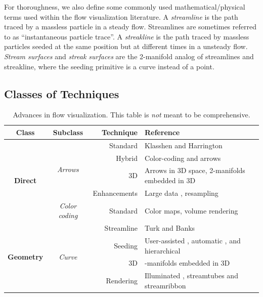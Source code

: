 For thoroughness, we also define some commonly used mathematical/physical terms used within the flow visualization literature.
A \emph{streamline} is the path traced by a massless particle in a steady flow. Streamlines are sometimes referred to as ``instantaneous particle trace''.
%
A \emph{streakline} is the path traced by massless particles seeded at the same position but at different times in a unsteady flow. 
%
\emph{Stream surfaces} and \emph{streak surfaces} are the 2-manifold analog of streamlines and streakline, where the seeding primitive is a curve instead of a point.

\subsection{Classes of Techniques}

\begin{table}
\caption{\label{table:progress}Advances in flow visualization. This table is \emph{not} meant to be comprehensive.}{}\centering
\begin{tabular}{c c r p{7.25cm}}
\toprule
Class &  Subclass & Technique & Reference\\
\hline
\multirow{5}{*}{\bf Direct} 	&\multirow{4}{*}{\em Arrows}		& \cc Standard  & \cc Klasshen and Harrington \cite{Klassen:1991:SHT:949607.949631} \\
					&							& \cc Hybrid  	& \cc Color-coding and arrows \cite{Kirby:1999:VMD:319351.319429}\\
					&							& \cc 3D  			& \cc Arrows in 3D space, 2-manifolds embedded in 3D \cite{Peng:2012:MVF:2086335.2086624}\\
					&							& \cc Enhancements& \cc Large data \cite{Peng:2012:MVF:2086335.2086624}, resampling \cite{Laramee2003905}\\
					&\multirow{1}{*}{\em Color coding}	&  Standard	&  Color maps, volume rendering \cite{Engel:2004:RVG:1103900.1103929}\\
\hline
\multirow{8}{*}{\bf Geometry}	&\multirow{5}{*}{\em Curve}	& \cc Streamline  	& \cc Turk and Banks \cite{Turk:1996:ISP:237170.237285}\\
						&						& \cc Seeding		& \cc User-assisted \cite{Jobard97creatingevenly-spaced}, automatic \cite{MebarkiAD05,li2008illustrative}, and hierarchical \cite{jobard2001multiresolution}\\
						&						& \cc 3D			& \cc 2-manifolds embedded in 3D \cite{spencer2009evenly}\\
						&						& \cc Rendering	& \cc Illuminated \cite{Mattausch:2003:SIE:984952.984987}, streamtubes and streamribbon \cite{Ueng:1996:ESS:614262.614333}\\

\end{tabular}
\end{table}
